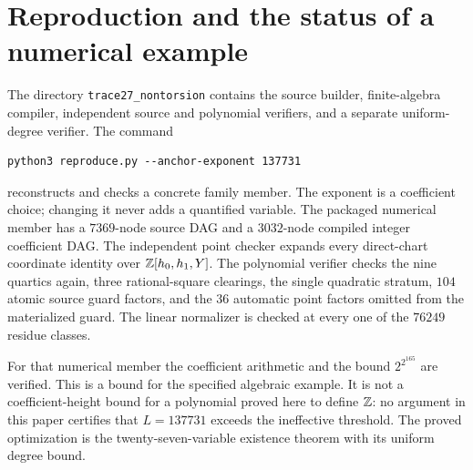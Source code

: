 \documentclass[11pt,a4paper]{article}
\begin{document}
\section{Reproduction and the status of a numerical example}

The directory \texttt{trace27\_nontorsion} contains the source
builder, finite-algebra compiler, independent source and
polynomial verifiers, and a separate uniform-degree verifier.
The command
\begin{verbatim}
python3 reproduce.py --anchor-exponent 137731
\end{verbatim}
reconstructs and checks a concrete family member. The exponent
is a coefficient choice; changing it never adds a quantified
variable. The packaged numerical member has a $7369$-node
source DAG and a $3032$-node compiled integer coefficient DAG.
The independent point checker expands every direct-chart coordinate
identity over $\mathbb Z[h_0,h_1,Y]$. The polynomial verifier checks
the nine quartics again, three
rational-square clearings, the single quadratic stratum,
$104$ atomic source guard factors, and the $36$ automatic
point factors omitted from the materialized guard. The linear normalizer is
checked at every one of the $76249$ residue classes.

For that numerical member the coefficient arithmetic and the
bound $2^{2^{165}}$ are verified. This is a bound for the
specified algebraic example. It is not a coefficient-height
bound for a polynomial proved here to define $\mathbb Z$: no argument
in this paper certifies that $L=137731$ exceeds the ineffective
threshold. The proved optimization is the twenty-seven-variable
existence theorem with its uniform degree bound.
\end{document}
